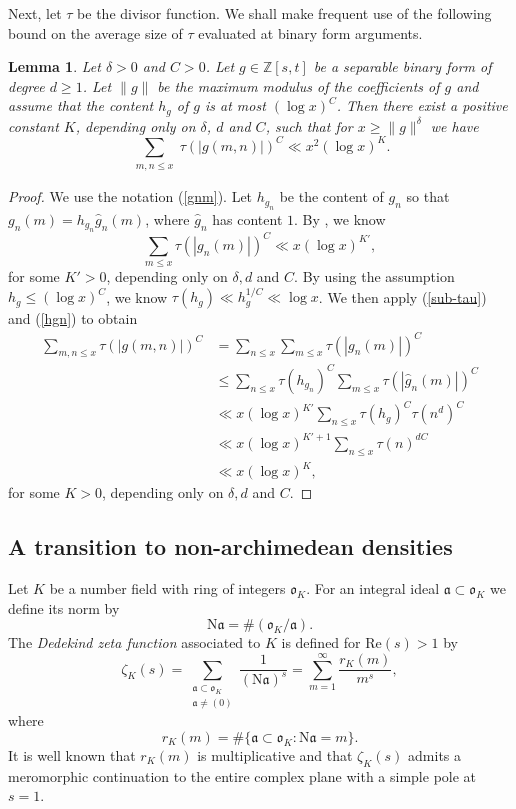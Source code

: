 \documentclass[reqno, 11pt]{amsart}
\renewcommand{\leq}{\leqslant}
\renewcommand{\geq}{\geqslant}
\newtheorem{lemma}[theorem]{Lemma}
\theoremstyle{definition}
\theoremstyle{definition}
\renewcommand{\geq}{\geqslant}
\renewcommand{\leq}{\leqslant}
\newcommand{\ZZ}{\mathbb{Z}}
\numberwithin{equation}{section}
\begin{document}
Next, let $\tau$ be the divisor function.
We shall make frequent use of the following bound on the average size of $\tau$ evaluated at binary form arguments. 

\begin{lemma}\label{poly-tau}
Let $\delta>0$ and $C>0$. Let $g \in \ZZ[s, t]$ be a separable binary form of degree $d\geq 1$. Let $\|g\|$ be the maximum modulus of the coefficients of $g$ and assume that the content $h_g$ of $g$ is at most $(\log x)^C$. Then there exist a positive constant $K$, depending only on $\delta$, $d$ and $C$, such that for $x \geq \|g\|^{\delta}$ we have
$$
\sum_{\substack{m, n\leq x}} \tau(|g(m, n)|)^C \ll x^2 (\log x)^{K}.
$$
\end{lemma}
\begin{proof}
	We use the notation (\ref{gnm}). Let $h_{g_n}$ be the content of $g_n$ so that $g_n(m) = h_{g_n} \hat{g}_n(m)$, where $\hat{g}_n$ has content $1$. By \cite[Lemma 6.2]{BST}, we know
	$$\sum_{m \leq x} \tau(|g_n(m)|)^C \ll x(\log x)^{K'},$$
	for some $K' > 0$, depending only on $\delta, d$ and $C$. 
	By using the assumption $h_g \leq (\log x)^C$, we know $\tau(h_g) \ll h_g^{1/C} \ll \log x$. We then apply (\ref{sub-tau}) and (\ref{hgn}) to obtain
	\begin{align*}
		\sum_{m, n \leq x} \tau(|g(m, n)|)^C & = \sum_{n \leq x} \sum_{m \leq x} \tau(|g_n(m)|)^C  \\
		& \leq \sum_{n \leq x} \tau(h_{g_n})^C \sum_{m \leq x} \tau(|\hat{g}_n(m)|)^C \\
		& \ll x(\log x)^{K'} \sum_{n \leq x} \tau(h_g)^C \tau(n^d)^C \\
		& \ll x(\log x)^{K' + 1} \sum_{n \leq x} \tau(n)^{dC} \\
		& \ll x(\log x)^K,
	\end{align*}
	for some $K > 0$, depending only on $\delta, d$ and $C$. 
\end{proof}



\subsection{A transition to non-archimedean densities}
Let $K$ be a number field with ring of integers $\mathfrak{o}_K$. For an integral ideal $\mathfrak{a} \subset \mathfrak{o}_K$ we define its norm by
$$\mathrm{N}\mathfrak{a}=\# (\mathfrak{o}_K/\mathfrak{a}).$$
The \emph{Dedekind zeta function} associated to $K$ is defined for $\mathrm{Re}(s)>1$ by
$$
\zeta_K(s)=\sum_{\substack{\mathfrak{a} \subset \mathfrak{o}_K\\\mathfrak{a}\neq (0)}} \frac{1}{(\mathrm{N} \mathfrak{a})^s} =
\sum_{m=1}^\infty \frac{r_K(m)}{m^{s}},
$$
where
$$
r_K(m)=\#\{\mathfrak{a} \subset \mathfrak{o}_K: \mathrm{N} \mathfrak{a}=m\}.
$$
It is well known that $r_K(m)$ is multiplicative and that $\zeta_K(s)$ admits a meromorphic continuation to the entire complex plane with a simple pole at $s=1$. 
\end{document}
